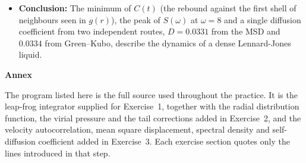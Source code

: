 \documentclass[11pt,a4paper]{article}
\begin{document}
\begin{itemize}
  \item \textbf{Conclusion:}
  The minimum of $C(t)$ (the rebound against the first shell of neighbours seen in $g(r)$), the peak of $S(\omega)$ at $\omega = 8$ and a single diffusion coefficient from two independent routes, $D = 0.0331$ from the MSD and $0.0334$ from Green--Kubo, describe the dynamics of a dense Lennard-Jones liquid.
\end{itemize}

\clearpage
\thispagestyle{empty}
\null
\vspace*{\fill}
\begin{center}
{\fontsize{48}{58}\selectfont\bfseries Annex}
\end{center}
\vspace*{\fill}
\clearpage
The program listed here is the full source used throughout the practice. It is the leap-frog integrator supplied for Exercise~1, together with the radial distribution function, the virial pressure and the tail corrections added in Exercise~2, and the velocity autocorrelation, mean square displacement, spectral density and self-diffusion coefficient added in Exercise~3. Each exercise section quotes only the lines introduced in that step.


\end{document}
